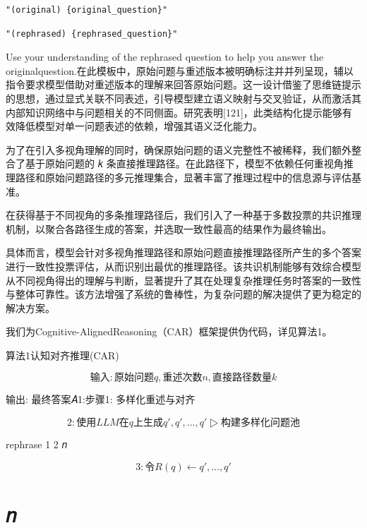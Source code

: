 \documentclass[12pt,a4paper,openright,UTF8]{ctexbook}
\begin{document}
\begin{lstlisting}
"(original) {original_question}"
\end{lstlisting}


\begin{lstlisting}
"(rephrased) {rephrased_question}"
\end{lstlisting}

Use your understanding of the rephrased question to help you answer the originalquestion.在此模板中，原始问题与重述版本被明确标注并并列呈现，辅以指令要求模型借助对重述版本的理解来回答原始问题。这一设计借鉴了思维链提示的思想，通过显式关联不同表述，引导模型建立语义映射与交叉验证，从而激活其内部知识网络中与问题相关的不同侧面。研究表明[121]，此类结构化提示能够有效降低模型对单一问题表述的依赖，增强其语义泛化能力。


为了在引入多视角理解的同时，确保原始问题的语义完整性不被稀释，我们额外整合了基于原始问题的 𝑘 条直接推理路径。在此路径下，模型不依赖任何重视角推理路径和原始问题路径的多元推理集合，显著丰富了推理过程中的信息源与评估基准。


在获得基于不同视角的多条推理路径后，我们引入了一种基于多数投票的共识推理机制，以聚合各路径生成的答案，并选取一致性最高的结果作为最终输出。


具体而言，模型会针对多视角推理路径和原始问题直接推理路径所产生的多个答案进行一致性投票评估，从而识别出最优的推理路径。该共识机制能够有效综合模型从不同视角得出的理解与判断，显著提升了其在处理复杂推理任务时答案的一致性与整体可靠性。该方法增强了系统的鲁棒性，为复杂问题的解决提供了更为稳定的解决方案。


我们为Cognitive-AlignedReasoning（CAR）框架提供伪代码，详见算法1。


算法1认知对齐推理(CAR)

\begin{equation}
输入: 原始问题q,重述次数n,直接路径数量k
\end{equation}

输出: 最终答案𝐴1:步骤1: 多样化重述与对齐

\begin{equation}
2: 使用LLM 在q 上生成q',q',\ldots,q' ▷构建多样化问题池
\end{equation}

rephrase 1 2 𝑛

\begin{equation}
3: 令R(q) \leftarrow {q',\ldots,q'}
\end{equation}


\chapter{𝑛}
\end{document}
